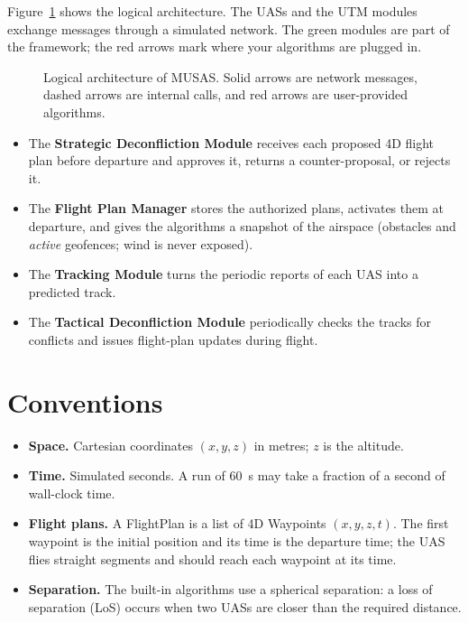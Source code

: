 \documentclass[11pt,a4paper,oneside]{report}
\newcommand{\code}[1]{\textcolor{primary!85!black}{\ttfamily\def\_{\textunderscore\allowbreak}#1}}
\begin{document}
Figure~\ref{fig:architecture} shows the logical architecture. The UASs and
the UTM modules exchange messages through a simulated network. The green
modules are part of the framework; the red arrows mark where your algorithms
are plugged in.

\begin{figure}[htbp]
  \centering
  \resizebox{0.92\linewidth}{!}{}
  \caption{Logical architecture of MUSAS. Solid arrows are network messages,
  dashed arrows are internal calls, and red arrows are user-provided
  algorithms.}
  \label{fig:architecture}
\end{figure}

\begin{itemize}
  \item The \textbf{Strategic Deconfliction Module} receives each proposed 4D
    flight plan before departure and approves it, returns a counter-proposal,
    or rejects it.
  \item The \textbf{Flight Plan Manager} stores the authorized plans,
    activates them at departure, and gives the algorithms a snapshot of the
    airspace (obstacles and \emph{active} geofences; wind is never exposed).
  \item The \textbf{Tracking Module} turns the periodic reports of each UAS
    into a predicted track.
  \item The \textbf{Tactical Deconfliction Module} periodically checks the
    tracks for conflicts and issues flight-plan updates during flight.
\end{itemize}

\section{Conventions}

\begin{itemize}
  \item \textbf{Space.} Cartesian coordinates \((x, y, z)\) in metres; \(z\)
    is the altitude.
  \item \textbf{Time.} Simulated seconds. A run of 60~s may take a fraction
    of a second of wall-clock time.
  \item \textbf{Flight plans.} A \code{FlightPlan} is a list of 4D
    \code{Waypoint}s \((x, y, z, t)\). The first waypoint is the initial
    position and its time is the departure time; the UAS flies straight
    segments and should reach each waypoint at its time.
  \item \textbf{Separation.} The built-in algorithms use a spherical
    separation: a loss of separation (LoS) occurs when two UASs are closer
    than the required distance.
\end{itemize}
\end{document}
